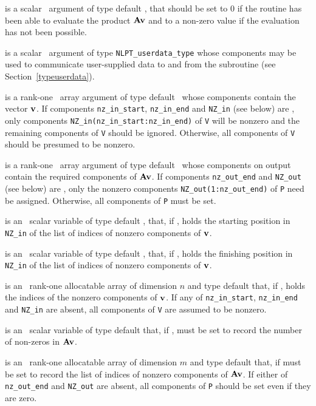 \documentclass{galahad}
\begin{document}
\begin{description}
 is a scalar \intentout\ argument of type default \integer,
that should be set to 0 if the routine has been able to evaluate the
product ${\mathbf{A}} {\mathbf{v}}$
and to a non-zero value if the evaluation has not been possible.

 is a scalar \intentinout\ argument of type
{\tt NLPT\_userdata\_type} whose components may be used
to communicate user-supplied data to and from the
subroutine (see Section~\ref{typeuserdata}).

 is a rank-one \intentin\ array argument of type default \realdp\
whose components contain the vector ${\mathbf{v}}$.
If components
{\tt nz\_in\_start},
{\tt nz\_in\_end}
and
{\tt NZ\_in}
(see below) are \present,
only components {\tt NZ\_in(nz\_in\_start:nz\_in\_end)} of {\tt V}
will be nonzero and the remaining components of {\tt V} should be
ignored. Otherwise, all components of {\tt V} should be presumed to be nonzero.

 is a rank-one \intentout\ array argument of type default \realdp\
whose components on output contain the required components of ${\mathbf{A}} {\mathbf{v}}$.
If components
{\tt nz\_out\_end}
and
{\tt NZ\_out}
(see below) are \present,
only the nonzero components {\tt NZ\_out(1:nz\_out\_end)} of {\tt P}
need be assigned.
Otherwise, all components of {\tt P} must be set.

 is an \optional\ scalar variable of type default \integer,
that, if \present, holds the starting position in {\tt NZ\_in}
of the list of indices of nonzero components of ${\mathbf{v}}$.

 is an \optional\ scalar variable of type default \integer,
that, if \present, holds the finishing position in {\tt NZ\_in}
of the list of indices of nonzero components of ${\mathbf{v}}$.

 is an \optional\  rank-one allocatable array of dimension $n$
and type default \integer that, if \present, holds the indices of the
nonzero components of ${\mathbf{v}}$. If any of
{\tt nz\_in\_start},
{\tt nz\_in\_end}
and
{\tt NZ\_in}
are absent, all components of {\tt V} are assumed to be nonzero.

\itt{nz\_out\_end} is an \optional\ scalar variable of type default \integer
that, if \present, must be set to record the number of non-zeros in
${\mathbf{A}} {\mathbf{v}}$.

 is an \optional\ rank-one allocatable array of dimension $m$
and type default \integer that, if \present must be set to record the list of
indices of nonzero components of ${\mathbf{A}} {\mathbf{v}}$.
If either of
{\tt nz\_out\_end}
and
{\tt NZ\_out}
are absent, all components of {\tt P} should be set even if they are zero.


\end{description}
\end{document}
